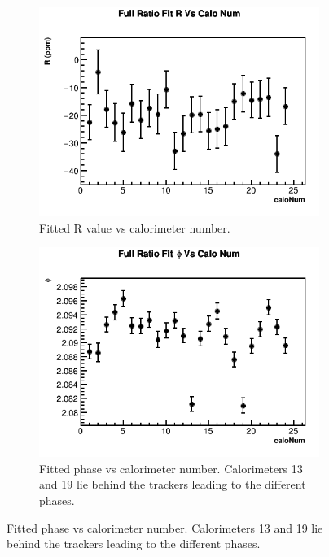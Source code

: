 \begin{figure}[H]
\centering
    \begin{subfigure}[t]{0.4\textwidth}
	    \centering
		\includegraphics[width=\textwidth]{RatioCBOFit_R_Vs_Calo_Canv}
	    \caption{Fitted R value vs calorimeter number.}
    \end{subfigure}
    \hspace{4mm}
    \begin{subfigure}[t]{0.4\textwidth}
	    \centering
		\includegraphics[width=\textwidth]{RatioCBOFit_phi_Vs_Calo_Canv}
	    \caption{Fitted \gmtwo phase vs calorimeter number. Calorimeters 13 and 19 lie behind the trackers leading to the different \gmtwo phases.}
    \end{subfigure}%

\end{figure}
